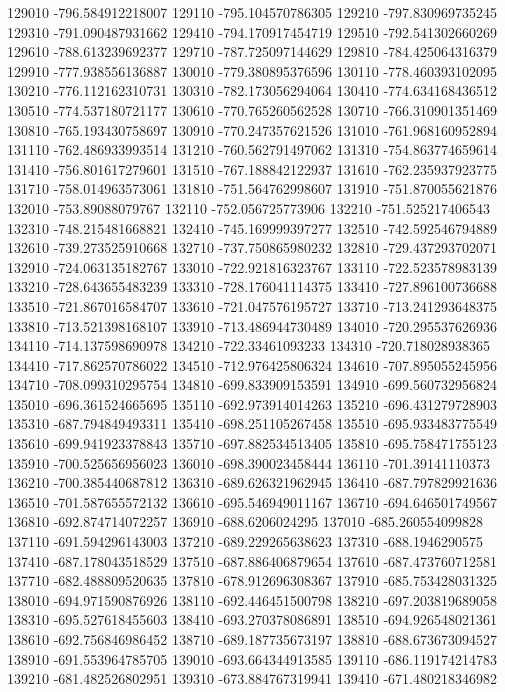 {129010 -796.584912218007
129110 -795.104570786305
129210 -797.830969735245
129310 -791.090487931662
129410 -794.170917454719
129510 -792.541302660269
129610 -788.613239692377
129710 -787.725097144629
129810 -784.425064316379
129910 -777.938556136887
130010 -779.380895376596
130110 -778.460393102095
130210 -776.112162310731
130310 -782.173056294064
130410 -774.634168436512
130510 -774.537180721177
130610 -770.765260562528
130710 -766.310901351469
130810 -765.193430758697
130910 -770.247357621526
131010 -761.968160952894
131110 -762.486933993514
131210 -760.562791497062
131310 -754.863774659614
131410 -756.801617279601
131510 -767.188842122937
131610 -762.235937923775
131710 -758.014963573061
131810 -751.564762998607
131910 -751.870055621876
132010 -753.89088079767
132110 -752.056725773906
132210 -751.525217406543
132310 -748.215481668821
132410 -745.169999397277
132510 -742.592546794889
132610 -739.273525910668
132710 -737.750865980232
132810 -729.437293702071
132910 -724.063135182767
133010 -722.921816323767
133110 -722.523578983139
133210 -728.643655483239
133310 -728.176041114375
133410 -727.896100736688
133510 -721.867016584707
133610 -721.047576195727
133710 -713.241293648375
133810 -713.521398168107
133910 -713.486944730489
134010 -720.295537626936
134110 -714.137598690978
134210 -722.33461093233
134310 -720.718028938365
134410 -717.862570786022
134510 -712.976425806324
134610 -707.895055245956
134710 -708.099310295754
134810 -699.833909153591
134910 -699.560732956824
135010 -696.361524665695
135110 -692.973914014263
135210 -696.431279728903
135310 -687.794849493311
135410 -698.251105267458
135510 -695.933483775549
135610 -699.941923378843
135710 -697.882534513405
135810 -695.758471755123
135910 -700.525656956023
136010 -698.390023458444
136110 -701.39141110373
136210 -700.385440687812
136310 -689.626321962945
136410 -687.797829921636
136510 -701.587655572132
136610 -695.546949011167
136710 -694.646501749567
136810 -692.874714072257
136910 -688.6206024295
137010 -685.260554099828
137110 -691.594296143003
137210 -689.229265638623
137310 -688.1946290575
137410 -687.178043518529
137510 -687.886406879654
137610 -687.473760712581
137710 -682.488809520635
137810 -678.912696308367
137910 -685.753428031325
138010 -694.971590876926
138110 -692.446451500798
138210 -697.203819689058
138310 -695.527618455603
138410 -693.270378086891
138510 -694.926548021361
138610 -692.756846986452
138710 -689.187735673197
138810 -688.673673094527
138910 -691.553964785705
139010 -693.664344913585
139110 -686.119174214783
139210 -681.482526802951
139310 -673.884767319941
139410 -671.480218346982
}
